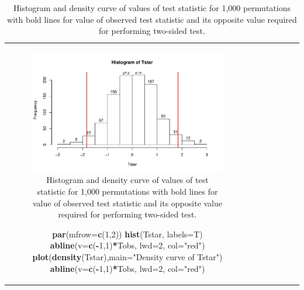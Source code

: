 \documentclass[]{book}
\newenvironment{Shaded}{\begin{snugshade}}{\end{snugshade}}
\newcommand{\KeywordTok}[1]{\textcolor[rgb]{0.13,0.29,0.53}{\textbf{#1}}}
\newcommand{\DataTypeTok}[1]{\textcolor[rgb]{0.13,0.29,0.53}{#1}}
\newcommand{\DecValTok}[1]{\textcolor[rgb]{0.00,0.00,0.81}{#1}}
\newcommand{\StringTok}[1]{\textcolor[rgb]{0.31,0.60,0.02}{#1}}
\newcommand{\OperatorTok}[1]{\textcolor[rgb]{0.81,0.36,0.00}{\textbf{#1}}}
\newcommand{\NormalTok}[1]{#1}
\theoremstyle{definition}
\theoremstyle{definition}
\theoremstyle{remark}
\begin{document}
\begin{longtable}[]{@{}ccccccc@{}}
\begin{minipage}[b]{0.10\columnwidth}
\begin{figure}
\centering
\includegraphics{02-reintroductionToStatistics_files/figure-latex/Figure2-11-1.pdf}
\caption{\label{fig:Figure2-11}Histogram and density curve of values of test statistic
for 1,000 permutations with bold lines for value of observed test
statistic and its opposite value required for performing two-sided test.}
\end{figure}

\begin{Shaded}
\begin{Highlighting}[]
\KeywordTok{par}\NormalTok{(}\DataTypeTok{mfrow=}\KeywordTok{c}\NormalTok{(}\DecValTok{1}\NormalTok{,}\DecValTok{2}\NormalTok{))}
\KeywordTok{hist}\NormalTok{(Tstar, }\DataTypeTok{labels=}\NormalTok{T)}
\KeywordTok{abline}\NormalTok{(}\DataTypeTok{v=}\KeywordTok{c}\NormalTok{(}\OperatorTok{-}\DecValTok{1}\NormalTok{,}\DecValTok{1}\NormalTok{)}\OperatorTok{*}\NormalTok{Tobs, }\DataTypeTok{lwd=}\DecValTok{2}\NormalTok{, }\DataTypeTok{col=}\StringTok{"red"}\NormalTok{)}
\KeywordTok{plot}\NormalTok{(}\KeywordTok{density}\NormalTok{(Tstar),}\DataTypeTok{main=}\StringTok{"Density curve of Tstar"}\NormalTok{)}
\KeywordTok{abline}\NormalTok{(}\DataTypeTok{v=}\KeywordTok{c}\NormalTok{(}\OperatorTok{-}\DecValTok{1}\NormalTok{,}\DecValTok{1}\NormalTok{)}\OperatorTok{*}\NormalTok{Tobs, }\DataTypeTok{lwd=}\DecValTok{2}\NormalTok{, }\DataTypeTok{col=}\StringTok{"red"}\NormalTok{)}
\end{Highlighting}
\end{Shaded}


\end{minipage}
\end{longtable}
\end{document}
